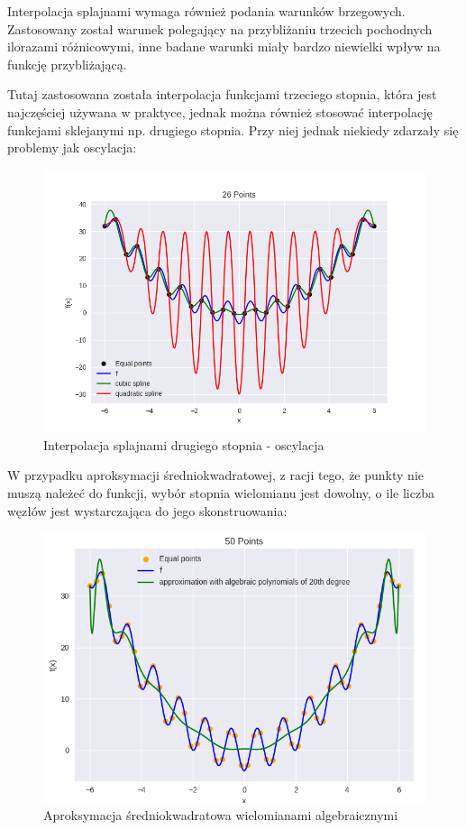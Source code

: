 \documentclass{article}
\begin{document}
Interpolacja splajnami wymaga również podania warunków brzegowych. Zastosowany został warunek polegający na przybliżaniu trzecich
pochodnych ilorazami różnicowymi, inne badane warunki miały bardzo niewielki wpływ na funkcję przybliżającą.

Tutaj zastosowana została interpolacja funkcjami trzeciego stopnia, która jest najczęściej używana w praktyce, 
jednak można również stosować interpolację funkcjami sklejanymi np. drugiego
stopnia. Przy niej jednak niekiedy zdarzały się problemy jak oscylacja:

\begin{figure}[H]
    \centering
    \includegraphics[width=\textwidth]{img/spline_26.png}
    \caption{Interpolacja splajnami drugiego stopnia - oscylacja}
\end{figure}

W przypadku aproksymacji średniokwadratowej, z racji tego, że punkty nie muszą należeć do funkcji, wybór stopnia wielomianu
jest dowolny, o ile liczba węzłów jest wystarczająca do jego skonstruowania:

\begin{figure}[H]
    \centering
    \includegraphics[width=\textwidth]{img/algpoly_20_50.png}
    \caption{Aproksymacja średniokwadratowa wielomianami algebraicznymi}
\end{figure}
\end{document}
